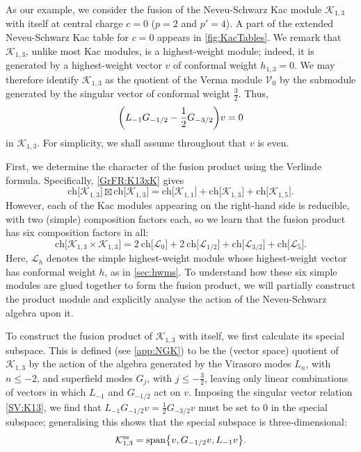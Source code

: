 \documentclass[a4paper,reqno,12pt]{report}
\theoremstyle{definition}
\numberwithin{equation}{section}
\let\originalleft\left     %
\let\originalright\right
\renewcommand{\left}{\mathopen{}\mathclose\bgroup\originalleft}
\renewcommand{\right}{\aftergroup\egroup\originalright}
\newcommand{\brac}[1]{\left( #1 \right)}
\newcommand{\set}[1]{\left\{ #1 \right\}}
\newcommand{\Ver}[1]{\mathcal{V}_{#1}}       %
\newcommand{\Irr}[1]{\mathcal{L}_{#1}}       %
\newcommand{\Kac}[1]{\mathcal{K}_{#1}}       %
\newcommand{\spsub}[1]{#1^{\text{ss}}}       %
\newcommand{\chmap}{\mathrm{ch}}
\newcommand{\Gr}[1]{\bigl[ #1 \bigr]}            %
\newcommand{\ch}[1]{\chmap \Gr{#1}}              %
\newcommand{\fuse}{\mathbin{\times}}                                            %
\newcommand{\Grfuse}{\mathbin{\boxtimes}}                                       %
\newcommand{\hw}{highest-weight}
\newcommand{\hws}{\hw{} vector}
\newcommand{\sv}{singular vector}
\newcommand{\hwm}{\hw{} module}
\newcommand{\rhs}{right-hand side}
\newcommand{\ns}{Neveu-Schwarz}
\DeclareMathOperator{\vspn}{span}
\renewcommand{\le}{\leqslant}
\theoremstyle{plain}
\begin{document}
As our example, we consider the fusion of the \ns{} Kac module $\Kac{1,3}$ with itself at central charge $c=0$ ($p=2$ and $p'=4$).  A part of the extended \ns{} Kac table for $c=0$ appears in \cref{fig:KacTables}.  We remark that $\Kac{1,3}$, unlike most Kac modules, is a \hwm{}; indeed, it is generated by a \hws{} $v$ of conformal weight $h_{1,3} = 0$.  We may therefore identify $\Kac{1,3}$ as the quotient of the Verma module $\Ver{0}$ by the submodule generated by the \sv{} of conformal weight $\frac{3}{2}$.  Thus,
\begin{equation} \label{SV:K13}
\brac{L_{-1} G_{-1/2} - \frac{1}{2} G_{-3/2}} v = 0
\end{equation}
in $\Kac{1,3}$.  For simplicity, we shall assume throughout that $v$ is even.

First, we determine the character of the fusion product using the Verlinde formula.  Specifically, \cref{GrFR:K13xK} gives
\begin{equation}
\ch{\Kac{1,3}} \Grfuse \ch{\Kac{1,3}} = \ch{\Kac{1,1}} + \ch{\Kac{1,3}} + \ch{\Kac{1,5}}.
\end{equation}
However, each of the Kac modules appearing on the \rhs{} is reducible, with two (simple) composition factors each, so we learn that the fusion product has six composition factors in all:
\begin{equation} \label{CompFact:K13xK13}
\ch{\Kac{1,3} \fuse \Kac{1,3}} = 2 \: \ch{\Irr{0}} + 2 \: \ch{\Irr{1/2}} + \ch{\Irr{3/2}} + \ch{\Irr{5}}.
\end{equation}
Here, $\Irr{h}$ denotes the simple \hwm{} whose \hws{} has conformal weight $h$, as in \cref{sec:hwms}.  To understand how these six simple modules are glued together to form the fusion product, we will partially construct the product module and explicitly analyse the action of the \ns{} algebra upon it.

To construct the fusion product of $\Kac{1,3}$ with itself, we first calculate its special subspace.  This is defined (see \cref{app:NGK}) to be the (vector space) quotient of $\Kac{1,3}$ by the action of the algebra generated by the Virasoro modes $L_n$, with $n \le -2$, and superfield modes $G_j$, with $j \le -\frac{3}{2}$, leaving only linear combinations of vectors in which $L_{-1}$ and $G_{-1/2}$ act on $v$.  Imposing the \sv{} relation \eqref{SV:K13}, we find that $L_{-1} G_{-1/2} v = \frac{1}{2} G_{-3/2} v$ must be set to $0$ in the special subspace; generalising this shows that the special subspace is three-dimensional:
\begin{equation}
\spsub{\Kac{1,3}} = \vspn \set{v, G_{-1/2}v, L_{-1}v}.
\end{equation}
\end{document}
